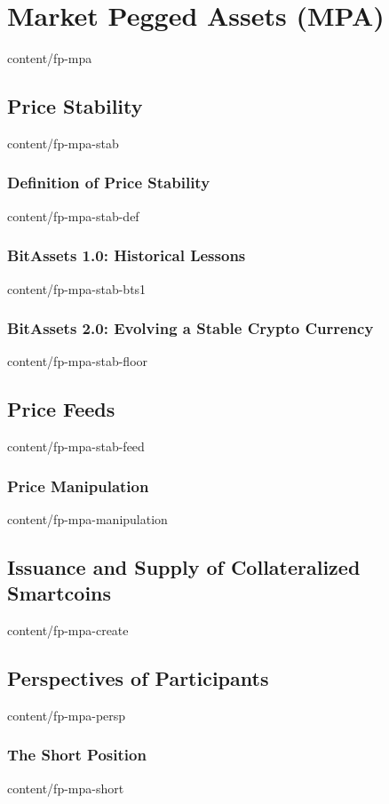 \documentclass{btswhitepaper}
\begin{document}
\section        { Market Pegged Assets (MPA)                       }  { content/fp-mpa                 } 
\subsection     { Price Stability                                  }  { content/fp-mpa-stab            } 
\subsubsection  { Definition of Price Stability                    }  { content/fp-mpa-stab-def        } 
\subsubsection  { BitAssets 1.0: Historical Lessons                }  { content/fp-mpa-stab-bts1       } 
\subsubsection  { BitAssets 2.0: Evolving a Stable Crypto Currency }  { content/fp-mpa-stab-floor      } 
\subsection     { Price Feeds                                      }  { content/fp-mpa-stab-feed       } 
\subsubsection  { Price Manipulation                               }  { content/fp-mpa-manipulation    } 
\subsection     { Issuance and Supply of Collateralized Smartcoins }  { content/fp-mpa-create          } 
\subsection     { Perspectives of Participants                     }  { content/fp-mpa-persp           } 
\subsubsection  { The Short Position                               }  { content/fp-mpa-short           } 
\end{document}
